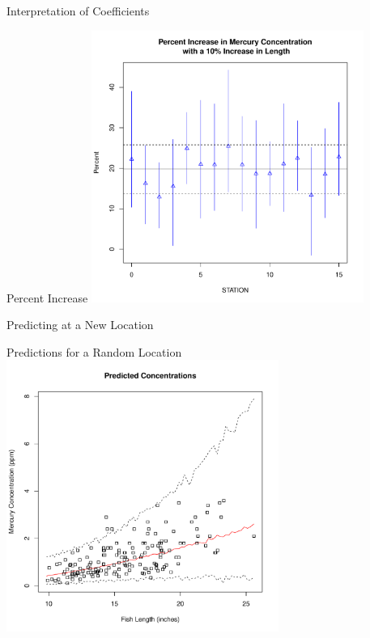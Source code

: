 \documentclass[]{beamer}
\begin{document}
\begin{frame}{Interpretation of Coefficients}

\end{frame}
\begin{frame}{Percent Increase}
     \includegraphics[height=3.5in]{increase}
\end{frame}
\begin{frame}{Predicting at a New Location}
\end{frame}

\begin{frame}{Predictions for a Random Location}
    \includegraphics[height=3.5in]{pred}
\end{frame}
\end{document}
